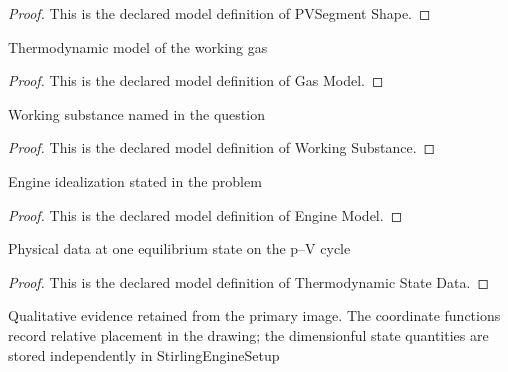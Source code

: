 \begin{proof}
  This is the declared model definition of PVSegment Shape.
\end{proof}
\begin{definition}
  \label{def:physics:phyx-mini-0355:phyxminiproblems-problemphyxmini0355-gasmodel}
  Thermodynamic model of the working gas
\end{definition}
\begin{proof}
  This is the declared model definition of Gas Model.
\end{proof}
\begin{definition}
  \label{def:physics:phyx-mini-0355:phyxminiproblems-problemphyxmini0355-workingsubstance}
  Working substance named in the question
\end{definition}
\begin{proof}
  This is the declared model definition of Working Substance.
\end{proof}
\begin{definition}
  \label{def:physics:phyx-mini-0355:phyxminiproblems-problemphyxmini0355-enginemodel}
  Engine idealization stated in the problem
\end{definition}
\begin{proof}
  This is the declared model definition of Engine Model.
\end{proof}
\begin{definition}
  \label{def:physics:phyx-mini-0355:phyxminiproblems-problemphyxmini0355-thermodynamicstatedata}
  Physical data at one equilibrium state on the p--V cycle
\end{definition}
\begin{proof}
  This is the declared model definition of Thermodynamic State Data.
\end{proof}
\begin{definition}
  \label{def:physics:phyx-mini-0355:phyxminiproblems-problemphyxmini0355-pressurevolumefigure}
  Qualitative evidence retained from the primary image. The coordinate functions record relative placement in the drawing; the dimensionful state quantities are stored independently in StirlingEngineSetup
\end{definition}
